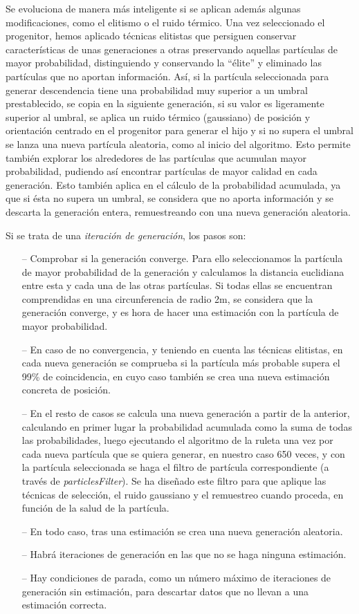 Se evoluciona de manera más inteligente si se aplican además algunas modificaciones, como el elitismo o el ruido térmico. Una vez seleccionado el progenitor, hemos aplicado técnicas elitistas que persiguen conservar características de unas generaciones a otras preservando aquellas partículas de mayor probabilidad, distinguiendo y conservando la “élite” y eliminado las partículas que no aportan información. Así, si la partícula seleccionada para generar descendencia tiene una probabilidad muy superior a un umbral prestablecido, se copia en la siguiente generación, si su valor es ligeramente superior al umbral, se aplica un ruido térmico (gaussiano) de posición y orientación centrado en el progenitor para generar el hijo y si no supera el umbral se lanza una nueva partícula aleatoria, como al inicio del algoritmo. Esto permite también explorar los alrededores de las partículas que acumulan mayor probabilidad, pudiendo así encontrar partículas de mayor calidad en cada generación. Esto también aplica en el cálculo de la probabilidad acumulada, ya que si ésta no supera un umbral, se considera que no aporta información y se descarta la generación entera, remuestreando con una nueva generación aleatoria.

Si se trata de una \textit{iteración de generación}, los pasos son:

\begin{itemize}
	\item[--] Comprobar si la generación converge. Para ello seleccionamos la partícula de mayor probabilidad de la generación y calculamos la distancia euclidiana entre esta y cada una de las otras partículas. Si todas ellas se encuentran comprendidas en una circunferencia de radio 2m, se considera que la generación converge, y es hora de hacer una estimación con la partícula de mayor probabilidad.
	\item[--] En caso de no convergencia, y teniendo en cuenta las técnicas elitistas, en cada nueva generación se comprueba si la partícula más probable supera el 99\% de coincidencia, en cuyo caso también se crea una nueva estimación concreta de posición.
	\item[--] En el resto de casos se calcula una nueva generación a partir de la anterior, calculando en primer lugar la probabilidad acumulada como la suma de todas las probabilidades, luego ejecutando el algoritmo de la ruleta una vez por cada nueva partícula que se quiera generar, en nuestro caso 650 veces, y con la partícula seleccionada se haga el filtro de partícula correspondiente (a través de \textit{particlesFilter}). Se ha diseñado este filtro para que aplique las técnicas de selección, el ruido gaussiano y el remuestreo cuando proceda, en función de la salud de la partícula.
	\item[--] En todo caso, tras una estimación se crea una nueva generación aleatoria.
	\item[--] Habrá iteraciones de generación en las que no se haga ninguna estimación.
	\item[--] Hay condiciones de parada, como un número máximo de iteraciones de generación sin estimación, para descartar datos que no llevan a una estimación correcta. 
\end{itemize}

